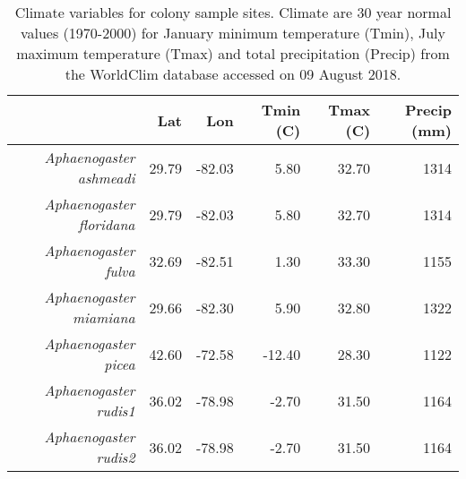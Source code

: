\begin{table}[ht]
\centering
\begin{tabular}{rrrrrr}
  \hline
 & Lat & Lon & Tmin (C) & Tmax (C) & Precip (mm) \\ 
  \hline
{\emph{Aphaenogaster ashmeadi}} & 29.79 & -82.03 & 5.80 & 32.70 & 1314 \\ 
  {\emph{Aphaenogaster floridana}} & 29.79 & -82.03 & 5.80 & 32.70 & 1314 \\ 
  {\emph{Aphaenogaster fulva}} & 32.69 & -82.51 & 1.30 & 33.30 & 1155 \\ 
  {\emph{Aphaenogaster miamiana}} & 29.66 & -82.30 & 5.90 & 32.80 & 1322 \\ 
  {\emph{Aphaenogaster picea}} & 42.60 & -72.58 & -12.40 & 28.30 & 1122 \\ 
  {\emph{Aphaenogaster rudis1}} & 36.02 & -78.98 & -2.70 & 31.50 & 1164 \\ 
  {\emph{Aphaenogaster rudis2}} & 36.02 & -78.98 & -2.70 & 31.50 & 1164 \\ 
   \hline
\end{tabular}
\caption{Climate variables for colony sample sites. Climate are 30 year normal values (1970-2000) for January minimum temperature (Tmin), July maximum temperature (Tmax) and total precipitation (Precip) from the WorldClim database accessed on 09 August 2018.} 
\label{tab:climate}
\end{table}
